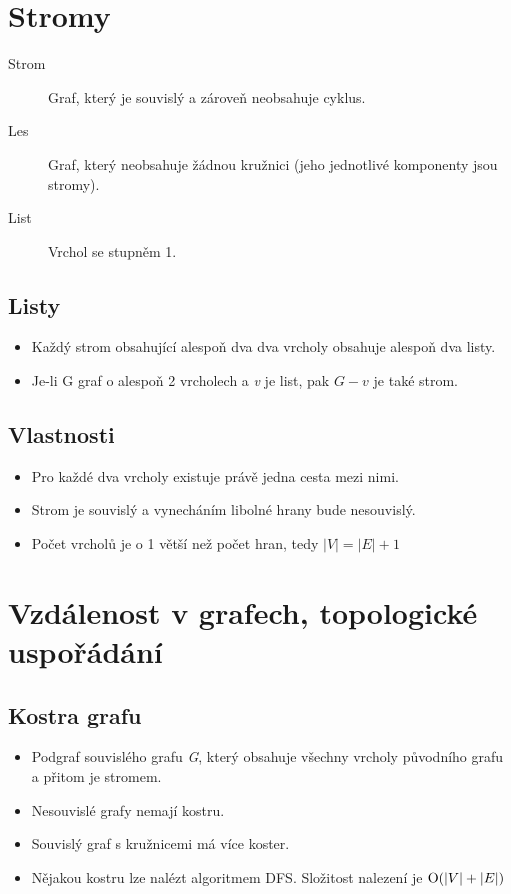 \documentclass{article}
\begin{document}
\section{Stromy}
  \begin{description}
    \item[Strom] Graf, který je souvislý a zároveň neobsahuje cyklus.
    \item[Les] Graf, který neobsahuje žádnou kružnici (jeho jednotlivé komponenty jsou stromy).
    \item[List] Vrchol se stupněm 1.
  \end{description}

  \subsection{Listy}
    \begin{itemize}
      \item Každý strom obsahující alespoň dva dva vrcholy obsahuje alespoň dva listy.
      \item Je-li G graf o alespoň 2 vrcholech a \emph{v} je list, pak $G - v$ je také strom.
    \end{itemize}

  \subsection{Vlastnosti}
    \begin{itemize}
      \item Pro každé dva vrcholy existuje právě jedna cesta mezi nimi.
      \item Strom je souvislý a vynecháním libolné hrany bude nesouvislý.
      \item Počet vrcholů je o 1 větší než počet hran, tedy $|V| = |E| + 1$
    \end{itemize}

\section{Vzdálenost v grafech, topologické uspořádání}
  \subsection{Kostra grafu}
  \begin{itemize}
    \item Podgraf souvislého grafu \emph{G}, který obsahuje všechny vrcholy původního grafu a přitom je stromem.
    \item Nesouvislé grafy nemají kostru.
    \item Souvislý graf s kružnicemi má více koster.
    \item Nějakou kostru lze nalézt algoritmem DFS. Složitost nalezení je $\textrm O(|V| + |E|)$
  \end{itemize}
\end{document}

